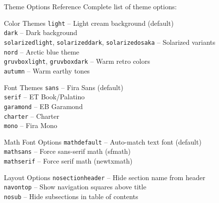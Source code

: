 \documentclass[aspectratio=169]{beamer}
\begin{document}
\begin{frame}[allowframebreaks]{Theme Options Reference}
  Complete list of theme options:

  \vspace{0.3em}

  \begin{shibuiframe}{Color Themes}
    \texttt{light} -- Light cream background (default) \\
    \texttt{dark} -- Dark background \\
    \texttt{solarizedlight}, \texttt{solarizeddark}, \texttt{solarizedosaka} -- Solarized variants \\
    \texttt{nord} -- Arctic blue theme \\
    \texttt{gruvboxlight}, \texttt{gruvboxdark} -- Warm retro colors \\
    \texttt{autumn} -- Warm earthy tones
  \end{shibuiframe}

  \vspace{0.3em}

  \begin{shibuiframe}{Font Themes}
    \texttt{sans} -- {\selectfont Fira Sans} (default) \\
    \texttt{serif} -- {\selectfont ET Book}/{\selectfont Palatino} \\
    \texttt{garamond} -- {\selectfont EB Garamond} \\
    \texttt{charter} -- {\selectfont Charter} \\
    \texttt{mono} -- {\selectfont Fira Mono}
  \end{shibuiframe}

  \vspace{0.3em}

  \begin{shibuiframe}{Math Font Options}
    \texttt{mathdefault} -- Auto-match text font (default) \\
    \texttt{mathsans} -- Force sans-serif math (sfmath) \\
    \texttt{mathserif} -- Force serif math (newtxmath)
  \end{shibuiframe}

  \vspace{0.3em}

  \begin{shibuiframe}{Layout Options}
    \texttt{nosectionheader} -- Hide section name from header \\
    \texttt{navontop} -- Show navigation squares above title \\
    \texttt{nosub} -- Hide subsections in table of contents
  \end{shibuiframe}


\end{frame}
\end{document}
